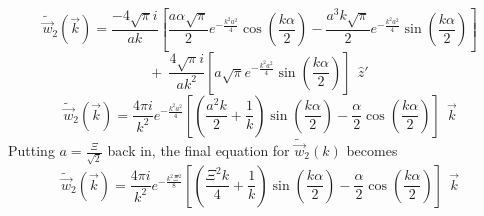 \documentclass[letterpaper,twocolumn,amsmath,amssymb,prb]{revtex4-1}
\begin{document}
\begin{widetext}
\begin{equation}{\widetilde{\vec{w}}_2(\vec{k})=\frac{-4\sqrt{\pi}i}{ak}\left[\frac{a\alpha\sqrt{\pi}}{2}e^{-\frac{k^2a^2}{4}}\cos\left(\frac{k\alpha}{2}\right)-\frac{a^3k\sqrt{\pi}}{2}e^{-\frac{k^2a^2}{4}}\sin\left(\frac{k\alpha}{2}\right)\right]}\end{equation} 
\begin{displaymath}{+{~~}\frac{4\sqrt{\pi}i}{ak^2}\left[a\sqrt{\pi}e^{-\frac{k^2a^2}{4}}\sin\left(\frac{k\alpha}{2}\right)\right]{~~}\hat{z}'}\end{displaymath}
\[{}\]
\begin{equation}{\widetilde{\vec{w}}_2(\vec{k})=\frac{4\pi{i}}{k^2}e^{-\frac{k^2a^2}{4}}\left[\left(\frac{a^2k}{2}+\frac{1}{k}\right)\sin\left(\frac{k\alpha}{2}\right)-\frac{\alpha}{2}\cos\left(\frac{k\alpha}{2}\right)\right]{~~}\vec{k}}\end{equation} 
Putting $a=\frac{\Xi}{\sqrt{2}}$ back in, the final equation for $\widetilde{\vec{w}}_2(k)$ becomes
\begin{equation}{\widetilde{\vec{w}}_2(\vec{k})=\frac{4\pi{i}}{k^2}e^{-\frac{k^2\Xi^2}{8}}\left[\left(\frac{\Xi^2k}{4}+\frac{1}{k}\right)\sin\left(\frac{k\alpha}{2}\right)-\frac{\alpha}{2}\cos\left(\frac{k\alpha}{2}\right)\right]{~~}\vec{k}}\end{equation} 
\[{}\]


\end{widetext}
\end{document}
